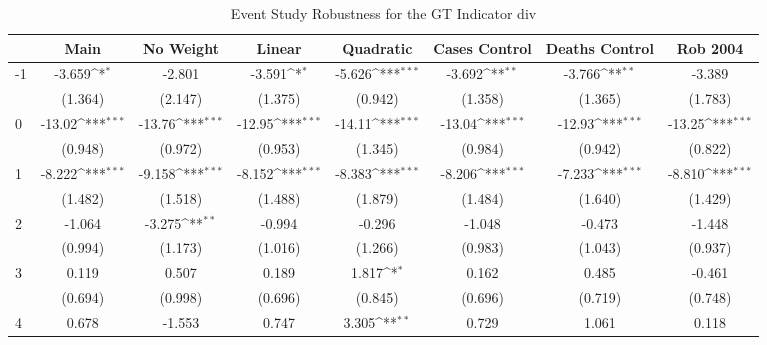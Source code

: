 \documentclass{article}
\begin{document}
{
\def\sym#1{\ifmmode^{#1}\else\(^{#1}\)\fi}
\begin{longtable}{l*{7}{c}}
\caption{Event Study Robustness for the GT Indicator div}\\
\hline\hline\endfirsthead\hline\endhead\hline\endfoot\endlastfoot
                &\multicolumn{1}{c}{Main}&\multicolumn{1}{c}{No Weight}&\multicolumn{1}{c}{Linear}&\multicolumn{1}{c}{Quadratic}&\multicolumn{1}{c}{Cases Control}&\multicolumn{1}{c}{Deaths Control}&\multicolumn{1}{c}{Rob 2004}\\
\hline
-1              &   -3.659\sym{*}  &   -2.801         &   -3.591\sym{*}  &   -5.626\sym{***}&   -3.692\sym{**} &   -3.766\sym{**} &   -3.389         \\
                &  (1.364)         &  (2.147)         &  (1.375)         &  (0.942)         &  (1.358)         &  (1.365)         &  (1.783)         \\
0               &   -13.02\sym{***}&   -13.76\sym{***}&   -12.95\sym{***}&   -14.11\sym{***}&   -13.04\sym{***}&   -12.93\sym{***}&   -13.25\sym{***}\\
                &  (0.948)         &  (0.972)         &  (0.953)         &  (1.345)         &  (0.984)         &  (0.942)         &  (0.822)         \\
1               &   -8.222\sym{***}&   -9.158\sym{***}&   -8.152\sym{***}&   -8.383\sym{***}&   -8.206\sym{***}&   -7.233\sym{***}&   -8.810\sym{***}\\
                &  (1.482)         &  (1.518)         &  (1.488)         &  (1.879)         &  (1.484)         &  (1.640)         &  (1.429)         \\
2               &   -1.064         &   -3.275\sym{**} &   -0.994         &   -0.296         &   -1.048         &   -0.473         &   -1.448         \\
                &  (0.994)         &  (1.173)         &  (1.016)         &  (1.266)         &  (0.983)         &  (1.043)         &  (0.937)         \\
3               &    0.119         &    0.507         &    0.189         &    1.817\sym{*}  &    0.162         &    0.485         &   -0.461         \\
                &  (0.694)         &  (0.998)         &  (0.696)         &  (0.845)         &  (0.696)         &  (0.719)         &  (0.748)         \\
4               &    0.678         &   -1.553         &    0.747         &    3.305\sym{**} &    0.729         &    1.061         &    0.118         \\

\end{longtable}}
\end{document}
